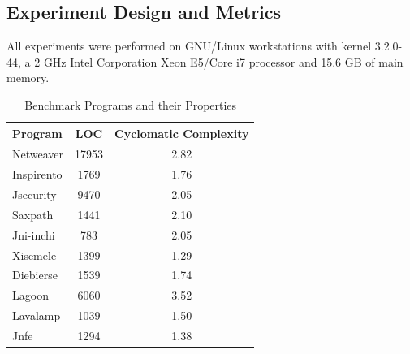 \subsection{Experiment Design and Metrics}
All experiments were performed on GNU/Linux workstations with kernel 3.2.0-44, a 2 GHz Intel Corporation Xeon E5/Core i7 processor and  15.6 GB of main memory. 
\begin{table}[!t]
\centering
\caption{Benchmark Programs and their Properties}
\label{tbl:program_table}
\begin{tabular}{|l|c|c|}
\hline
\textbf{Program} & \textbf{LOC} &\textbf{Cyclomatic Complexity} \\ \hline
Netweaver                              & 17953                              & 2.82                                                \\ \hline
Inspirento                             & 1769                               & 1.76                                                \\ \hline
Jsecurity                              & 9470                               & 2.05                                                \\ \hline
Saxpath                                & 1441                               & 2.10                                                \\ \hline
Jni-inchi                              & 783                                & 2.05                                                \\ \hline
Xisemele                               & 1399                               & 1.29                                                \\ \hline
Diebierse                              & 1539                               & 1.74                                                \\ \hline
Lagoon                                 & 6060                               & 3.52                                                \\ \hline
Lavalamp                               & 1039                               & 1.50                                                \\ \hline
Jnfe                                   & 1294                               & 1.38                                                \\ \hline
\end{tabular}
\end{table}


